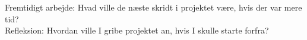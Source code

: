 Fremtidigt arbejde: Hvad ville de næste skridt i projektet være, hvis der var mere tid?\\
Refleksion: Hvordan ville I gribe projektet an, hvis I skulle starte forfra? 

